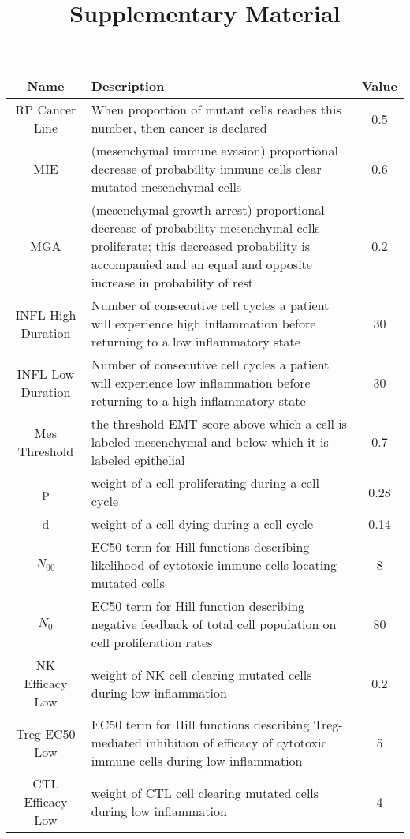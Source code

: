 \documentclass[11pt, a4paper, preprint]{article}
\title{Supplementary Material}
\author{}
\begin{document}
\maketitle

\begin{center}
 \begin{longtable}{||c | p{10cm} | c||} 
 \hline
 Name & Description & Value  \\ [0.5ex] 
 \hline\hline
 RP Cancer Line & When proportion of mutant cells reaches this number, then cancer is declared & 0.5  \\ 
 \hline
 MIE & (mesenchymal immune evasion) proportional decrease of probability immune cells clear mutated mesenchymal cells & 0.6  \\
 \hline
 MGA & (mesenchymal growth arrest) proportional decrease of probability mesenchymal cells proliferate; this decreased probability is accompanied and an equal and opposite increase in probability of rest & 0.2  \\
 \hline
 INFL High Duration & Number of consecutive cell cycles a patient will experience high inflammation before returning to a low inflammatory state & 30  \\
 \hline
INFL Low Duration & Number of consecutive cell cycles a patient will experience low inflammation before returning to a high inflammatory state & 30  \\
 \hline
Mes Threshold & the threshold EMT score above which a cell is labeled mesenchymal and below which it is labeled epithelial & 0.7 \\
 \hline
 p & weight of a cell proliferating during a cell cycle & 0.28 \\ 
 \hline
 d & weight of a cell dying during a cell cycle & 0.14 \\
 \hline
 $N_{00}$ & EC50 term for Hill functions describing likelihood of cytotoxic immune cells locating mutated cells & 8\\
 \hline
 $N_0$ & EC50 term for Hill function describing negative feedback of total cell population on cell proliferation rates & 80 \\
 \hline
  NK Efficacy Low & weight of NK cell clearing mutated cells during low inflammation & 0.2 \\
  \hline
  Treg EC50 Low & EC50 term for Hill functions describing Treg-mediated inhibition of efficacy of cytotoxic immune cells during low inflammation & 5 \\
  \hline
  CTL Efficacy Low & weight of CTL cell clearing mutated cells during low inflammation & 4 \\

\end{longtable}
\end{center}
\end{document}
